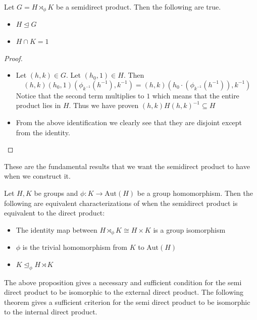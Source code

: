\documentclass[a4paper]{article}
\begin{document}
\begin{lmm}{}{} Let $G=H\rtimes_\phi K$ be a semidirect product. Then the following are true. 
\begin{itemize}
\item $H\trianglelefteq G$
\item $H\cap K=1$
\end{itemize}\tcbline
\begin{proof}~\\
\begin{itemize}
\item Let $(h,k)\in G$. Let $(h_0,1)\in H$. Then $$(h,k)(h_0,1)(\phi_{k^{-1}}(h^{-1}),k^{-1})=(h,k)(h_0\cdot(\phi_{k^{-1}}(h^{-1})),k^{-1})$$ Notice that the second term multiplies to $1$ which means that the entire product lies in $H$. Thus we have proven $(h,k)H(h,k)^{-1}\subseteq H$
\item From the above identification we clearly see that they are disjoint except from the identity. 
\end{itemize}
\end{proof}
\end{lmm}

These are the fundamental results that we want the semidirect product to have when we construct it. 

\begin{prp}{}{} Let $H,K$ be groups and $\phi:K\to\text{Aut}(H)$ be a group homomorphism. Then the following are equivalent characterizations of when the semidirect product is equivalent to the direct product: 
\begin{itemize}
\item The identity map between $H\rtimes_\phi K\cong H\times K$ is a group isomorphism
\item $\phi$ is the trivial homomorphism from $K$ to $\text{Aut}(H)$
\item $K\trianglelefteq_\phi H\rtimes K$
\end{itemize}
\end{prp}

The above proposition gives a necessary and sufficient condition for the semi direct product to be isomorphic to the external direct product. The following theorem gives a sufficient criterion for the semi direct product to be isomorphic to the internal direct product. 
\end{document}
